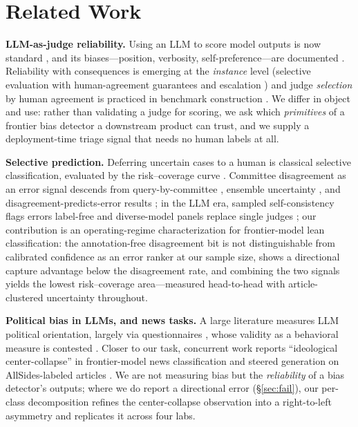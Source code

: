 \documentclass{article}
\begin{document}
\section{Related Work}
\textbf{LLM-as-judge reliability.} Using an LLM to score model outputs is
now standard \citep{zheng2023judging}, and its biases---position,
verbosity, self-preference---are documented
\citep{ye2024justice,panickssery2024selfpreference}. Reliability with
consequences is emerging at the \emph{instance} level (selective
evaluation with human-agreement guarantees and escalation
\citep{jung2025trust}) and judge \emph{selection} by human agreement is
practiced in benchmark construction \citep{dubois2024length,lambert2024tulu}.
We differ in object and use: rather than validating a judge for
scoring, we ask which \emph{primitives} of a frontier bias detector a
downstream product can trust, and we supply a deployment-time triage
signal that needs no human labels at all.

\textbf{Selective prediction.} Deferring uncertain cases to a human is
classical selective classification, evaluated by the risk--coverage curve
\citep{elyaniv2010foundations,geifman2017selective}. Committee disagreement as an
error signal descends from query-by-committee \citep{seung1992query},
ensemble uncertainty \citep{lakshminarayanan2017simple}, and
disagreement-predicts-error results \citep{jiang2022assessing}; in the
LLM era, sampled self-consistency flags errors label-free
\citep{manakul2023selfcheckgpt} and diverse-model panels replace single
judges \citep{verga2024replacing};
our contribution is an operating-regime characterization for
frontier-model lean classification: the annotation-free disagreement bit
is not distinguishable from calibrated confidence as an error ranker at
our sample size, shows a directional capture advantage below the
disagreement rate, and combining the two signals yields the lowest
risk--coverage area---measured head-to-head with article-clustered
uncertainty throughout.

\textbf{Political bias in LLMs, and news tasks.} A large literature
measures LLM political orientation, largely via questionnaires
\citep{feng2023pretraining,santurkar2023opinions}, whose validity as a
behavioral measure is contested \citep{rottger2024political}. Closer to
our task, concurrent work reports ``ideological center-collapse'' in
frontier-model news classification and steered generation on
AllSides-labeled articles \citep{kennedy2026left}. We are not measuring
bias but the \emph{reliability} of a bias detector's outputs; where we do
report a directional error (\S\ref{sec:fail}), our per-class
decomposition refines the center-collapse observation into a
right-to-left asymmetry and replicates it across four labs.
\end{document}
